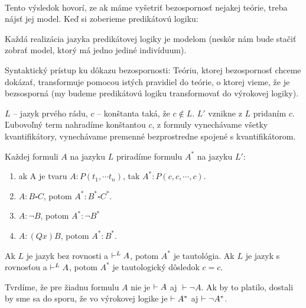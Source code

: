 \paragraph{}
\par Tento výsledok hovorí, ze ak máme vyšetriť bezospornosť nejakej teórie,
treba nájsť jej model. Keď si zoberieme predikátovú logiku:

\par Každá realizácia jazyka predikátovej logiky je modelom (neskôr nám bude
stačiť zobrať model, ktorý má jedno jediné indivíduum).  

\par
Syntaktický prístup ku dôkazu bezospornosti: Teóriu, ktorej bezospornosť chceme
dokázať, transformuje pomocou istých pravidiel do teórie, o ktorej vieme, že je
bezsosporná  (my budeme predikátovú logiku transformovať do výrokovej logiky).

\par $L$ -- jazyk prvého rádu, $c$ -- konštanta taká, že $c \notin L$. $L'$
vznikne z $L$ pridaním $c$. Ľubovoľný term nahradíme konštantou $c$, z formuly
vynechávame všetky kvantifikátory, vynechávame premenné bezprostredne spojené s
kvantifikátorom.

\par Každej formuli $A$ na jazyku $L$ priradíme formulu $A^*$ na jazyku $L'$:
\begin{enumerate}
	\item ak A je tvaru $A: P(t_1, \cdots t_n)$, tak $A^*: P(c, c, \cdots,c)$.
	\item $A: B \square C$, potom $A^*: B^* \square C^*$.
	\item $A: \neg B$, potom $A^*: \neg B^*$
	\item $A: (Qx) B$, potom $A^*: B^*$.
\end{enumerate}

Ak $L$ je jazyk bez rovnosti a $\vdash^L A$, potom $A^*$ je tautológia. Ak $L$
je jazyk s rovnosťou a $\vdash^L A$, potom $A^*$ je tautologický dôsledok $c=c$.

\par Tvrdíme, že pre žiadnu formulu $A$ nie je $\vdash A$ aj $\vdash \neg A$. Ak
by to platilo, dostali by sme sa do sporu, že vo výrokovej logike je $\vdash
A^*$ aj $\vdash \neg A^*$.
